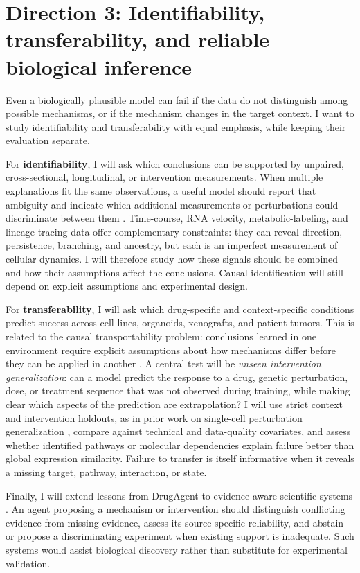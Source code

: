 \documentclass[11pt]{article}
\begin{document}
\section*{Direction 3: Identifiability, transferability, and reliable biological inference}

Even a biologically plausible model can fail if the data do not distinguish among possible mechanisms, or if the mechanism changes in the target context. I want to study identifiability and transferability with equal emphasis, while keeping their evaluation separate.

For \textbf{identifiability}, I will ask which conclusions can be supported by unpaired, cross-sectional, longitudinal, or intervention measurements. When multiple explanations fit the same observations, a useful model should report that ambiguity and indicate which additional measurements or perturbations could discriminate between them \citep{pearl2009causality}. Time-course, RNA velocity, metabolic-labeling, and lineage-tracing data offer complementary constraints: they can reveal direction, persistence, branching, and ancestry, but each is an imperfect measurement of cellular dynamics. I will therefore study how these signals should be combined and how their assumptions affect the conclusions. Causal identification will still depend on explicit assumptions and experimental design.

For \textbf{transferability}, I will ask which drug-specific and context-specific conditions predict success across cell lines, organoids, xenografts, and patient tumors. This is related to the causal transportability problem: conclusions learned in one environment require explicit assumptions about how mechanisms differ before they can be applied in another \citep{bareinboim2016datafusion}. A central test will be \emph{unseen intervention generalization}: can a model predict the response to a drug, genetic perturbation, dose, or treatment sequence that was not observed during training, while making clear which aspects of the prediction are extrapolation? I will use strict context and intervention holdouts, as in prior work on single-cell perturbation generalization \citep{lotfollahi2023cpa,bunne2023cellot}, compare against technical and data-quality covariates, and assess whether identified pathways or molecular dependencies explain failure better than global expression similarity. Failure to transfer is itself informative when it reveals a missing target, pathway, interaction, or state.

Finally, I will extend lessons from DrugAgent to evidence-aware scientific systems \citep{inoue2026drugagent}. An agent proposing a mechanism or intervention should distinguish conflicting evidence from missing evidence, assess its source-specific reliability, and abstain or propose a discriminating experiment when existing support is inadequate. Such systems would assist biological discovery rather than substitute for experimental validation.
\end{document}
